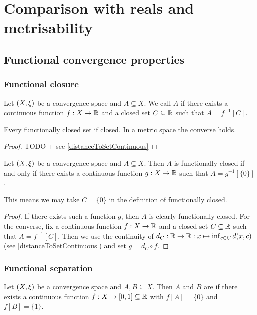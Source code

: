 \section{Comparison with reals and metrisability}
\subsection{Functional convergence properties}
\subsubsection{Functional closure}
\begin{definition}
Let $\left( X,\xi \right)$ be a convergence space and $A\subseteq X$. We call $A$  if there exists a continuous function $f: X\to \mathbb{R}$ and a closed set $C\subseteq \mathbb{R}$ such that $A = f^{-1}[C]$.
\end{definition}

\begin{proposition}
Every functionally closed set if closed. In a metric space the converse holds.
\end{proposition}
\begin{proof}
TODO + see \ref{distanceToSetContinuous}
\end{proof}

\begin{lemma} \label{functionallyClosedZeroSet}
Let $\left( X,\xi \right)$ be a convergence space and $A\subseteq X$. Then $A$ is functionally closed \textup{if and only if} there exists a continuous function $g: X\to \mathbb{R}$ such that $A = g^{-1}[\{0\}]$.
\end{lemma}
This means we may take $C = \{0\}$ in the definition of functionally closed.
\begin{proof}
If there exists such a function $g$, then $A$ is clearly functionally closed. For the converse, fix a continuous function $f: X\to \mathbb{R}$ and a closed set $C\subseteq \mathbb{R}$ such that $A = f^{-1}[C]$. Then we use the continuity of $d_C: \mathbb{R}\to\mathbb{R}: x\mapsto \inf_{c\in C}d(x,c)$ (see \ref{distanceToSetContinuous}) and set $g = d_C\circ f$.
\end{proof}

\subsubsection{Functional separation}
\begin{definition}
Let $\left( X,\xi \right)$ be a convergence space and $A,B\subseteq X$. Then $A$ and $B$ are  if there exists a continuous function $f: X\to [0,1]\subseteq \mathbb{R}$ with $f[A] = \{0\}$ and $f[B] = \{1\}$.
\end{definition}

